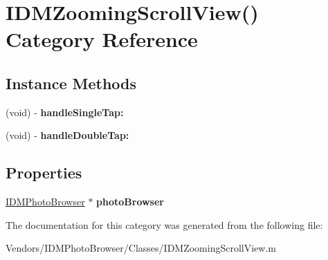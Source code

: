 \hypertarget{category_i_d_m_zooming_scroll_view_07_08}{}\section{I\+D\+M\+Zooming\+Scroll\+View() Category Reference}
\label{category_i_d_m_zooming_scroll_view_07_08}
\subsection*{Instance Methods}
\begin{DoxyCompactItemize}
\item 
\hypertarget{category_i_d_m_zooming_scroll_view_07_08_ac503af1d103548e012a0c9a5af0d43e7}{}(void) -\/ {\bfseries handle\+Single\+Tap\+:}\label{category_i_d_m_zooming_scroll_view_07_08_ac503af1d103548e012a0c9a5af0d43e7}

\item 
\hypertarget{category_i_d_m_zooming_scroll_view_07_08_a61dbea1605fedf8ca1d12d222d73f7c5}{}(void) -\/ {\bfseries handle\+Double\+Tap\+:}\label{category_i_d_m_zooming_scroll_view_07_08_a61dbea1605fedf8ca1d12d222d73f7c5}

\end{DoxyCompactItemize}
\subsection*{Properties}
\begin{DoxyCompactItemize}
\item 
\hypertarget{category_i_d_m_zooming_scroll_view_07_08_abc7f872b70d375028fb336d31ec42f9d}{}\hyperlink{interface_i_d_m_photo_browser}{I\+D\+M\+Photo\+Browser} $\ast$ {\bfseries photo\+Browser}\label{category_i_d_m_zooming_scroll_view_07_08_abc7f872b70d375028fb336d31ec42f9d}

\end{DoxyCompactItemize}


The documentation for this category was generated from the following file\+:\begin{DoxyCompactItemize}
\item 
Vendors/\+I\+D\+M\+Photo\+Browser/\+Classes/I\+D\+M\+Zooming\+Scroll\+View.\+m\end{DoxyCompactItemize}
